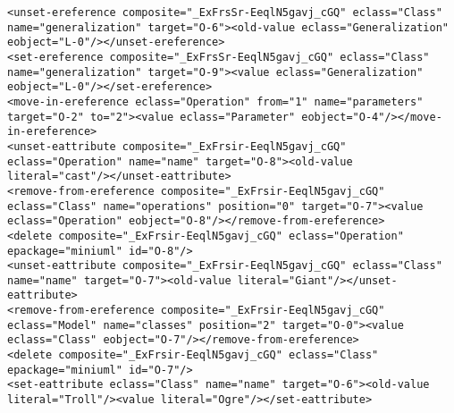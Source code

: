 \begin{lstlisting}[style=cbpfile,caption={Change-based representation of the model in Figure \ref{fig:class_diagram_left}.},label=lst:class_diagram_left_cbpfile]
<unset-ereference composite="_ExFrsSr-EeqlN5gavj_cGQ" eclass="Class" name="generalization" target="O-6"><old-value eclass="Generalization" eobject="L-0"/></unset-ereference>
<set-ereference composite="_ExFrsSr-EeqlN5gavj_cGQ" eclass="Class" name="generalization" target="O-9"><value eclass="Generalization" eobject="L-0"/></set-ereference>
<move-in-ereference eclass="Operation" from="1" name="parameters" target="O-2" to="2"><value eclass="Parameter" eobject="O-4"/></move-in-ereference>
<unset-eattribute composite="_ExFrsir-EeqlN5gavj_cGQ" eclass="Operation" name="name" target="O-8"><old-value literal="cast"/></unset-eattribute>
<remove-from-ereference composite="_ExFrsir-EeqlN5gavj_cGQ" eclass="Class" name="operations" position="0" target="O-7"><value eclass="Operation" eobject="O-8"/></remove-from-ereference>
<delete composite="_ExFrsir-EeqlN5gavj_cGQ" eclass="Operation" epackage="miniuml" id="O-8"/>
<unset-eattribute composite="_ExFrsir-EeqlN5gavj_cGQ" eclass="Class" name="name" target="O-7"><old-value literal="Giant"/></unset-eattribute>
<remove-from-ereference composite="_ExFrsir-EeqlN5gavj_cGQ" eclass="Model" name="classes" position="2" target="O-0"><value eclass="Class" eobject="O-7"/></remove-from-ereference>
<delete composite="_ExFrsir-EeqlN5gavj_cGQ" eclass="Class" epackage="miniuml" id="O-7"/>
<set-eattribute eclass="Class" name="name" target="O-6"><old-value literal="Troll"/><value literal="Ogre"/></set-eattribute>
\end{lstlisting}
